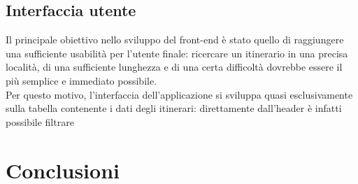 \documentclass[11pt]{report}
\begin{document}
\subsection{Interfaccia utente}
Il principale obiettivo nello sviluppo del front-end è stato quello di raggiungere una sufficiente usabilità per l'utente finale: ricercare un itinerario in una precisa località, di una sufficiente lunghezza e di una certa difficoltà dovrebbe essere il più semplice e immediato possibile.
\\Per questo motivo, l'interfaccia dell'applicazione si sviluppa quasi esclusivamente sulla tabella contenente i dati degli itinerari: direttamente dall'header è infatti possibile filtrare 


\section{Conclusioni}
\end{document}
